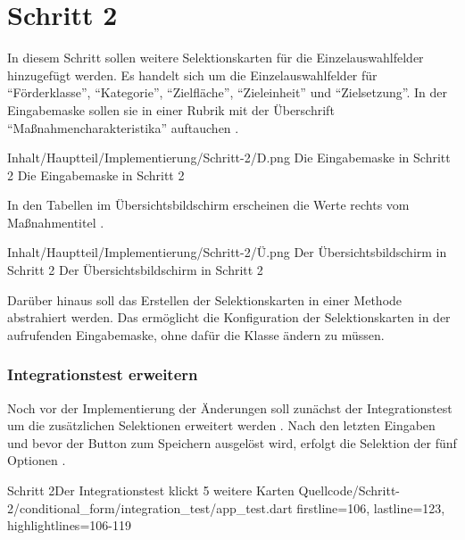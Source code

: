 \chapter{Schritt 2}
\label{chap:Schritt-2}



In diesem Schritt sollen weitere Selektionskarten für die Einzelauswahlfelder hinzugefügt werden.
Es handelt sich um die Einzelauswahlfelder für \enquote{Förderklasse}, \enquote{Kategorie}, \enquote{Zielfläche}, \enquote{Zieleinheit} und \enquote{Zielsetzung}.
In der Eingabemaske sollen sie in einer Rubrik mit der Überschrift \enquote{Maßnahmencharakteristika} auftauchen \Abb{\ref{fig:Schritt2Eingabemaske}}.

\begin{alexfigure}{Inhalt/Hauptteil/Implementierung/Schritt-2/D.png}
  {Die Eingabemaske in Schritt 2}
  {Die Eingabemaske in Schritt 2}

  \label{fig:Schritt2Eingabemaske}

\end{alexfigure}

In den Tabellen im Übersichtsbildschirm erscheinen  die Werte  rechts  vom Maßnahmentitel \Abb{\ref{fig:Schritt2Uebersicht}}.
\begin{alexfigure}{Inhalt/Hauptteil/Implementierung/Schritt-2/Ü.png}
  {Der Übersichtsbildschirm in Schritt 2}
  {Der Übersichtsbildschirm in Schritt 2}

  \label{fig:Schritt2Uebersicht}

\end{alexfigure}

Darüber hinaus soll das Erstellen der Selektionskarten in einer Methode abstrahiert werden.
Das ermöglicht die Konfiguration der Selektionskarten in der aufrufenden Eingabemaske, ohne dafür die Klasse  ändern zu müssen.

\subsection{Integrationstest erweitern}

Noch vor der Implementierung der Änderungen soll zunächst der Integrationstest um die zusätzlichen Selektionen erweitert werden \Lst{\ref{lst:Schritt2IntegrationstestKlickt5WeitereKarten}}.
Nach den letzten Eingaben und bevor der Button zum Speichern ausgelöst wird, erfolgt die Selektion der fünf Optionen .

\begin{alexlisting}{Schritt 2}{Der Integrationstest klickt 5 weitere Karten}
  {Quellcode/Schritt-2/conditional_form/integration_test/app_test.dart}
  {firstline=106, lastline=123, highlightlines={106-119}}
  \label{lst:Schritt2IntegrationstestKlickt5WeitereKarten}
\end{alexlisting}

